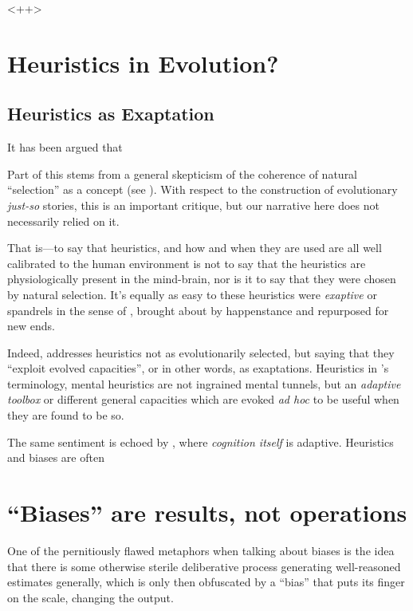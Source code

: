 \documentclass{article}
\begin{document}
<++>


\section{Heuristics in Evolution?}

\textcite{schulz11}


\subsection{Heuristics as Exaptation}

It has been argued \parencite{massimo89,gould91} that 

Part of this stems from a general skepticism of the coherence of natural ``selection'' as a concept (see \textcite{fodor10}).
With respect to the construction of evolutionary \textit{just-so} stories, this is an important critique, but our narrative here does not necessarily relied on it.

That is---to say that heuristics, and how and when they are used are all well calibrated to the human environment is not to say that the heuristics are physiologically present in the mind-brain, nor is it to say that they were chosen by natural selection.
It's equally as easy to these heuristics were \emph{exaptive} \parencite{buss98} or spandrels in the sense of \textcite{gould79}, brought about by happenstance and repurposed for new ends.

Indeed, \textcite{gigerenzer08} addresses heuristics not as evolutionarily selected, but saying that they ``exploit evolved capacities'', or in other words, as exaptations.
Heuristics in \textcite{gigerenzer08}'s terminology, mental heuristics are not ingrained mental tunnels, but an \emph{adaptive toolbox} or different general capacities which are evoked \emph{ad hoc} to be useful when they are found to be so.

The same sentiment is echoed by \textcite{anderson90}, where \emph{cognition itself} is adaptive.
Heuristics and biases are often 

\section{``Biases'' are results, not operations}

One of the pernitiously flawed metaphors when talking about biases is the idea that there is some otherwise sterile deliberative process generating well-reasoned estimates generally, which is only then obfuscated by a ``bias'' that puts its finger on the scale, changing the output.
\end{document}
